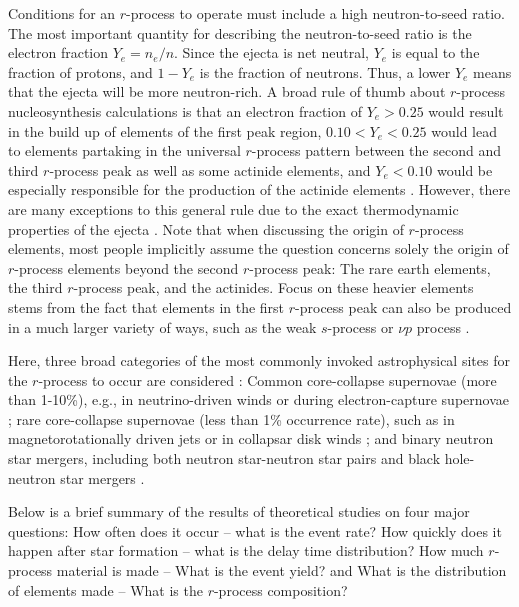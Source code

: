 \documentclass[letterpaper]{article}
\begin{document}
Conditions for an $r$-process to operate must include a high neutron-to-seed ratio. The most important quantity for describing the neutron-to-seed ratio is the electron fraction $Y_e = n_e/n$. Since the ejecta is net neutral, $Y_e$ is  equal to the fraction of protons, and $1-Y_e$ is the fraction of neutrons. Thus, a lower $Y_e$ means that the ejecta will be more neutron-rich.
A broad rule of thumb about $r$-process nucleosynthesis calculations is that an electron fraction of $Y_e > 0.25$ would result in the build up of elements of the first peak region, $0.10 < Y_e < 0.25$ would lead to elements partaking in the universal $r$-process pattern between the second and third $r$-process peak as well as some actinide elements, and $Y_e < 0.10$ would be especially responsible for the production of the actinide elements \citep[e.g.,][]{Lippuner15,Wu2016,holmbeck2019}.
However, there are many exceptions to this general rule due to the exact thermodynamic properties of the ejecta \citep[e.g.,][]{Farouqi10,Wanajo14,Mumpower2016,Curtis2021}.
Note that when discussing the origin of $r$-process elements, most people implicitly assume the question concerns solely the origin of $r$-process elements beyond the second $r$-process peak: The rare earth elements, the third $r$-process peak, and the actinides. Focus on these heavier elements stems from the fact that elements in the first $r$-process peak can also be produced in a much larger variety of ways, such as the weak $s$-process or $\nu p$ process \citep{Sukhbold2016, Frohlich2006}.

Here, three broad categories of the most commonly invoked astrophysical sites for the $r$-process to occur are considered \citep{Cowan2021}:
Common core-collapse supernovae (more than 1-10\%), e.g., in neutrino-driven winds \citep[e.g.,][]{Woosley92,woosley94,Farouqi10,Arcones11} or during electron-capture supernovae \citep{Ning2007,Janka2008,Wanajo2011};
rare core-collapse supernovae (less than 1\% occurrence rate), such as in magnetorotationally driven jets \citep{Winteler2012,Nishimura2015,Nishimura2017,Mosta2018} or in collapsar disk winds \citep{Pruet2004,Surman2011,Siegel2019,Miller2020};
and binary neutron star mergers, including both neutron star-neutron star pairs and black hole-neutron star mergers \citep[e.g.,][]{Lattimer74,Lattimer76,Lattimer77,Surman2008,Hotokezaka2013,Goriely11,Goriely2013,rosswog14,Wanajo14,Eichler2015,Just15,Wu2016,Lippuner2017,Curtis2021}.

Below is a brief summary of the results of theoretical studies on four major questions:
How often does it occur -- what is the event rate?
How quickly does it happen after star formation -- what is the delay time distribution?
How much $r$-process material is made -- What is the event yield? and
What is the distribution of elements made -- What is the $r$-process composition?
\end{document}
